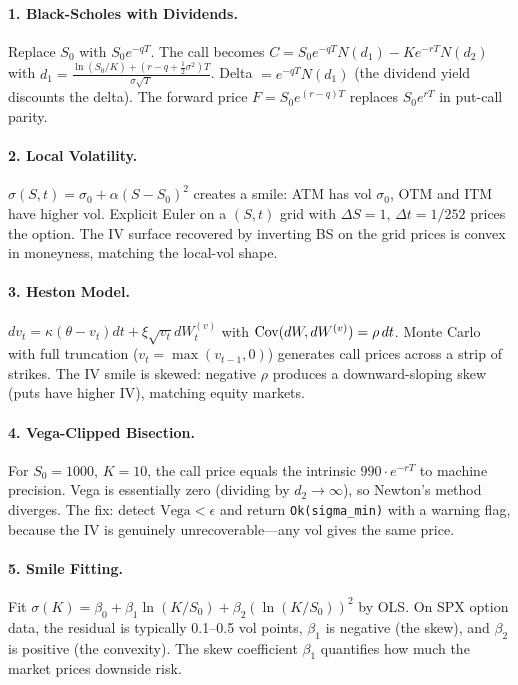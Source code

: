 \paragraph{1. Black-Scholes with Dividends.}
Replace $S_0$ with $S_0 e^{-qT}$. The call becomes $C = S_0 e^{-qT}
N(d_1) - K e^{-rT} N(d_2)$ with $d_1 = \frac{\ln(S_0/K) + (r - q +
\tfrac{1}{2}\sigma^2)T}{\sigma\sqrt{T}}$. Delta $= e^{-qT} N(d_1)$
(the dividend yield discounts the delta). The forward price
$F = S_0 e^{(r-q)T}$ replaces $S_0 e^{rT}$ in put-call parity.

\paragraph{2. Local Volatility.}
$\sigma(S, t) = \sigma_0 + \alpha (S - S_0)^2$ creates a smile: ATM
has vol $\sigma_0$, OTM and ITM have higher vol. Explicit Euler on
a $(S, t)$ grid with $\Delta S = 1$, $\Delta t = 1/252$ prices the
option. The IV surface recovered by inverting BS on the grid prices
is convex in moneyness, matching the local-vol shape.

\paragraph{3. Heston Model.}
$dv_t = \kappa(\theta - v_t) dt + \xi \sqrt{v_t} dW^{(v)}_t$ with
$\text{Cov}(dW, dW^{(v)}) = \rho \, dt$. Monte Carlo with full truncation
($v_t = \max(v_{t-1}, 0)$) generates call prices across a strip of
strikes. The IV smile is skewed: negative $\rho$ produces a
downward-sloping skew (puts have higher IV), matching equity
markets.

\paragraph{4. Vega-Clipped Bisection.}
For $S_0 = 1000$, $K = 10$, the call price equals the intrinsic
$990 \cdot e^{-rT}$ to machine precision. Vega is essentially zero
(dividing by $d_2 \to \infty$), so Newton's method diverges. The fix:
detect $\text{Vega} < \epsilon$ and return
\texttt{Ok(sigma\_min)} with a warning flag, because the IV is
genuinely unrecoverable---any vol gives the same price.

\paragraph{5. Smile Fitting.}
Fit $\sigma(K) = \beta_0 + \beta_1 \ln(K/S_0) + \beta_2
(\ln(K/S_0))^2$ by OLS. On SPX option data, the residual is
typically 0.1--0.5 vol points, $\beta_1$ is negative (the skew),
and $\beta_2$ is positive (the convexity). The skew coefficient
$\beta_1$ quantifies how much the market prices downside risk.

